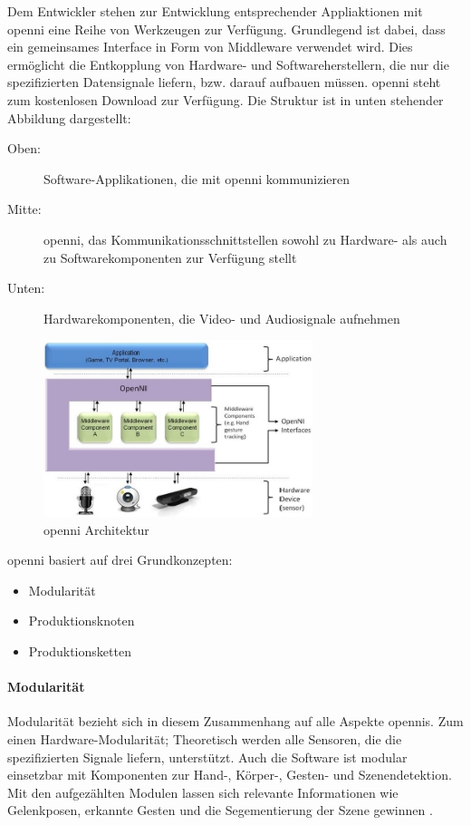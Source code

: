 Dem Entwickler stehen zur Entwicklung entsprechender Appliaktionen mit \gls{openni} eine Reihe von Werkzeugen zur Verfügung.
Grundlegend ist dabei, dass ein gemeinsames Interface in Form von Middleware verwendet wird.
Dies ermöglicht die Entkopplung von Hardware- und Softwareherstellern, die nur die spezifizierten Datensignale liefern, bzw. darauf aufbauen müssen.
\gls{openni} steht zum kostenlosen Download zur Verfügung.
Die Struktur ist in unten stehender Abbildung dargestellt: 

\begin{description}
 \item[Oben:] Software-Applikationen, die mit \gls{openni} kommunizieren
 \item[Mitte:] \gls{openni}, das Kommunikationsschnittstellen sowohl zu Hardware- als auch zu Softwarekomponenten zur Verfügung stellt
 \item[Unten:] Hardwarekomponenten, die Video- und Audiosignale aufnehmen
\end{description}

\begin{figure}[h]
	\center
	\includegraphics[width=0.7\textwidth]{graphics/openNI.jpg}
	\caption{\label{fig:openNI} \gls{openni} Architektur \cite{kinect_6}}
\end{figure}

\gls{openni} basiert auf drei Grundkonzepten:
\begin{itemize}
  \item Modularität
  \item Produktionsknoten
  \item Produktionsketten
\end{itemize}


\paragraph{Modularität}
Modularität bezieht sich in diesem Zusammenhang auf alle Aspekte \glspl{openni}.
Zum einen Hardware-Modularität;
Theoretisch werden alle Sensoren, die die spezifizierten Signale liefern, unterstützt.
Auch die Software ist modular einsetzbar mit Komponenten zur Hand-, Körper-, Gesten- und Szenendetektion.
Mit den aufgezählten Modulen lassen sich relevante Informationen wie Gelenkposen, erkannte Gesten und die Segementierung der Szene gewinnen \cite{kinect_6}.

